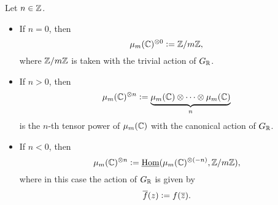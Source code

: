 \begin{definition}
  Let $n \in \mathbb{Z}$.

  \begin{itemize}
  \item If $n = 0$, then
    $$\mu_m (\mathbb{C})^{\otimes 0} \mathrel{\mathop:}= \mathbb{Z}/m\mathbb{Z},$$
    where $\mathbb{Z}/m\mathbb{Z}$ is taken with the trivial action of $G_{\mathbb{R}}$.

  \item If $n > 0$, then
    \[ \mu_m (\mathbb{C})^{\otimes n} \mathrel{\mathop:}=
      \underbrace{\mu_m (\mathbb{C})\otimes\cdots\otimes\mu_m (\mathbb{C})}_n \]
    is the $n$-th tensor power of $\mu_m (\mathbb{C})$ with the canonical action of
    $G_{\mathbb{R}}$.

  \item If $n < 0$, then
    \[ \mu_m (\mathbb{C})^{\otimes n} \mathrel{\mathop:}=
      \underline{\operatorname{Hom}} (\mu_m (\mathbb{C})^{\otimes (-n)}, \mathbb{Z}/m\mathbb{Z}), \]
    where in this case the action of $G_{\mathbb{R}}$ is given by
    $$\overline{f} (z) \mathrel{\mathop:}= f (\overline{z}).$$
  \end{itemize}
\end{definition}

